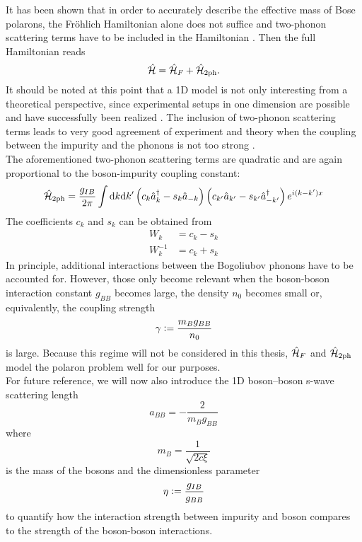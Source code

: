 It has been shown that in order to accurately describe the effective mass of Bose polarons, the Fröhlich Hamiltonian alone does not suffice and two-phonon scattering terms have to be included in the Hamiltonian \cite{Grusdt_2017}. Then the full Hamiltonian reads
\begin{equation}\label{full_ham}
\hat{\mathcal{H}} = \hat{\mathcal{H}}_F + \hat{\mathcal{H}}_{2\mathrm{ph}}.
\end{equation}
It should be noted at this point that a 1D model is not only interesting from a theoretical perspective, since experimental setups in one dimension are possible and have successfully been realized \cite{Catani}. The inclusion of two-phonon scattering terms leads to very good agreement of experiment and theory when the coupling between the impurity and the phonons is not too strong \cite{Grusdt_2017}. \\
The aforementioned two-phonon scattering terms are quadratic and are again proportional to the boson-impurity coupling constant:
\begin{equation}
\hat{\mathcal{H}}_{2\mathrm{ph}}=\frac{g_{IB}}{2\pi}\int\mathrm d k\mathrm d k^\prime \left(c_k\hat a^\dagger_k-s_k\hat a_{-k}\right)\left(c_{k^\prime}\hat a_{k^\prime}-s_{k^\prime}\hat a^\dagger_{-k^\prime}\right)e^{i(k-k^\prime)x}
\end{equation}
The coefficients $c_k$ and $s_k$ can be obtained from 
\begin{subequations}
\begin{align}
W_k &= c_k - s_k\\
W_k^{-1} &= c_k + s_k
\end{align}
\end{subequations}
In principle, additional interactions between the Bogoliubov phonons have to be accounted for. However, those only become relevant when the boson-boson interaction constant $g_{BB}$ becomes large, the density $n_0$ becomes small or, equivalently, the coupling strength \begin{equation}\gamma\vcentcolon=\frac{m_B g_{BB}}{n_0}\end{equation} is large. Because this regime will not be considered in this thesis, $\hat{\mathcal{H}}_F$ and $\hat{\mathcal{H}}_{2\mathrm{ph}}$ model the polaron problem well for our purposes.\\
For future reference, we will now also introduce the 1D boson–boson s-wave scattering length 
\begin{equation}
a_{BB}=-\frac{2}{m_Bg_{BB}}
\end{equation}
where \begin{equation}m_B = \frac{1}{\sqrt{2c\xi}}\end{equation} is the mass of the bosons
and the dimensionless parameter 
\begin{equation}
\eta\vcentcolon= \frac{g_{IB}}{g_{BB}}
\end{equation}
to quantify how the interaction strength between impurity and boson compares to the strength of the boson-boson interactions.

